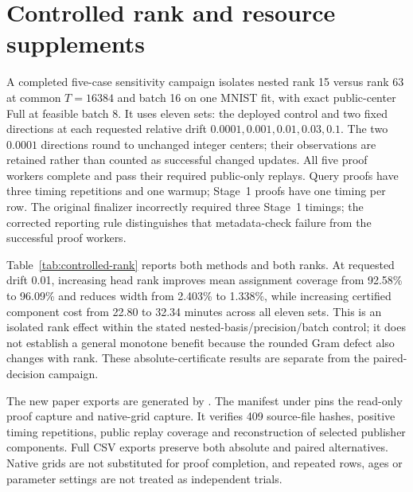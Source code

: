 \section{Controlled rank and resource supplements}\label{app:paired-controls}
A completed five-case sensitivity campaign isolates nested rank 15 versus
rank 63 at common $T=16384$ and batch 16 on one MNIST fit, with exact public-center
Full at feasible batch 8. It uses eleven sets: the deployed control and two
fixed directions at each requested relative drift
$0.0001,0.001,0.01,0.03,0.1$. The two $0.0001$ directions round to unchanged
integer centers; their observations are retained rather than counted as
successful changed updates. All five proof workers complete and pass their
required public-only replays. Query proofs have three timing repetitions and
one warmup; Stage~1 proofs have one timing per row. The original finalizer
incorrectly required three Stage~1 timings; the corrected reporting rule
distinguishes that metadata-check failure from the successful proof workers.

Table~\ref{tab:controlled-rank} reports both methods and both ranks. At requested
drift 0.01, increasing head rank improves mean assignment coverage from 92.58\%
to 96.09\% and reduces width from 2.403\% to 1.338\%, while increasing certified
component cost from 22.80 to 32.34 minutes across all eleven sets. This is an
isolated rank effect within the stated nested-basis/precision/batch control;
it does not establish a general monotone benefit because the rounded Gram
defect also changes with rank. These absolute-certificate results are separate
from the paired-decision campaign.



The new paper exports are generated by
. The manifest under
 pins the read-only proof
capture and native-grid capture. It verifies 409 source-file hashes, positive
timing repetitions, public replay coverage and reconstruction of selected
publisher components. Full CSV exports preserve both absolute and paired
alternatives. Native grids are not substituted for proof completion, and
repeated rows, ages or parameter settings are not treated as independent trials.
